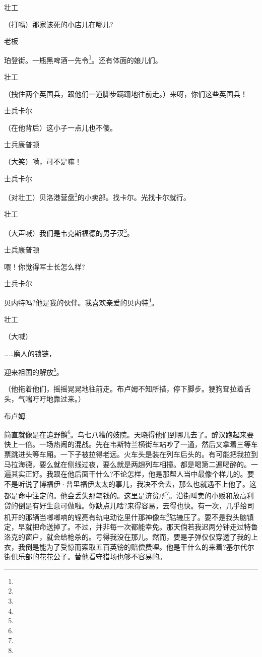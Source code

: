 \par 壮工
\par （打嗝）那家该死的小店儿在哪儿?
\par 老板
\par 珀登街。一瓶黑啤酒一先令\footnote{}。还有体面的娘儿们。
\par 壮工
\par （拽住两个英国兵，跟他们一道脚步蹒跚地往前走。）来呀，你们这些英国兵！
\par 士兵卡尔
\par （在他背后）这小子一点儿也不傻。
\par 士兵康普顿
\par （大笑）嗬，可不是嘛！
\par 士兵卡尔
\par （对壮工）贝洛港营盘\footnote{}的小卖部。找卡尔。光找卡尔就行。
\par 壮工
\par （大声喊）我们是韦克斯福德的男子汉\footnote{}。
\par 士兵康普顿
\par 喂！你觉得军士长怎么样?
\par 士兵卡尔
\par 贝内特吗?他是我的伙伴。我喜欢亲爱的贝内特\footnote{}。
\par 壮工
\par （大喊）
\par ……磨人的锁链，
\par 迎来祖国的解放\footnote{}。
\par （他拖着他们，摇摇晃晃地往前走。布卢姆不知所措，停下脚步。㹴狗耷拉着舌头，气喘吁吁地靠过来。）
\par 布卢姆
\par 简直就像是在追野鹅\footnote{}。乌七八糟的妓院。天晓得他们到哪儿去了。醉汉跑起来要快上一倍。一场热闹的混战。先在韦斯特兰横街车站吵了一通，然后又拿着三等车票跳进头等车厢。一下子被拉得老远。火车头是装在列车后头的。有可能把我拉到马拉海德，要么就在侧线过夜，要么就是两趟列车相撞。都是喝第二遍喝醉的。一遍其实正好。我跟在他后面干什么?不论怎样，他是那帮人当中最像个样儿的。要不是听说了博福伊·普里福伊太太的事儿，我决不会去，那么也就遇不上他了。这都是命中注定的。他会丢失那笔钱的。这里是济贫所\footnote{}。沿街叫卖的小贩和放高利贷的倒是有好生意可做啦。你缺点儿啥?来得容易，去得也快。有一次，几乎给司机开的那辆当啷啷响的锃亮有轨电动讫里什那神像车\footnote{}轱辘压了。要不是我头脑镇定，早就把命送掉了。不过，并非每一次都能幸免。那天倘若我迟两分钟走过特鲁洛克的窗户，就会给枪杀的。亏得我没在那儿。然而，要是子弹仅仅穿透了我的上衣，我倒是能为了受惊而索取五百英镑的赔偿费哩。他是干什么的来着?基尔代尔街俱乐部的花花公子。替他看守猎场也够不容易的。
